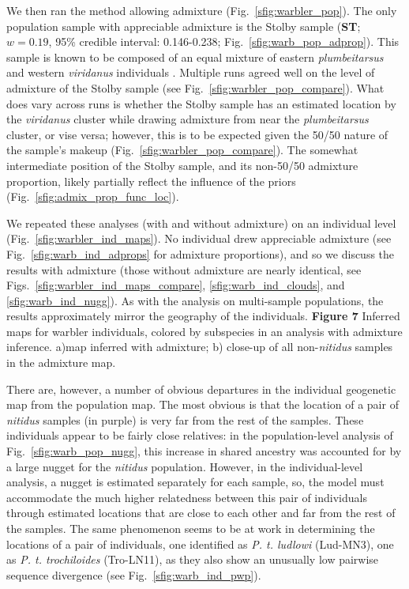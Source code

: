 \documentclass[10pt,letterpaper]{article}
\begin{document}
We then ran the method allowing admixture (Fig.\ \ref{sfig:warbler_pop}). The only population sample with appreciable admixture is the Stolby sample (\textbf{ST}; $w=0.19$, 95\% credible interval: 0.146-0.238; Fig.\ \ref{sfig:warb_pop_adprop}).  This sample is known to be composed of an equal mixture of eastern \textit{plumbeitarsus} and western \textit{viridanus} individuals \cite{alcaide2014genomic}. Multiple runs agreed well on the level of admixture of the Stolby sample (see Fig.\ \ref{sfig:warbler_pop_compare}). What does vary across runs is whether the Stolby sample has an estimated location by the \textit{viridanus} cluster while drawing admixture from near the \textit{plumbeitarsus} cluster, or vise versa; however, this is to be expected given the 50/50 nature of the sample's makeup (Fig.\ \ref{sfig:warbler_pop_compare}). The somewhat intermediate position of the Stolby sample, and its non-50/50 admixture proportion, likely partially reflect the influence of the priors (Fig.\ \ref{sfig:admix_prop_func_loc}). 

We repeated these analyses (with and without admixture) on an individual level (Fig.\ \ref{sfig:warbler_ind_maps}).  
No individual drew appreciable admixture (see Fig.\ \ref{sfig:warb_ind_adprops} for admixture proportions), and so we discuss the results with admixture (those without admixture are nearly identical, see Figs.\ \ref{sfig:warbler_ind_maps_compare}, \ref{sfig:warb_ind_clouds}, and \ref{sfig:warb_ind_nugg}).  As with the analysis on multi-sample populations, the results approximately mirror the geography of the individuals.
%
\newline\newline
{\bf{Figure 7}} Inferred maps for warbler individuals, colored by subspecies in an analysis with admixture inference.  a)map inferred with admixture; b) close-up of all non-\textit{nitidus} samples in the admixture map.
\newline\newline

There are, however, a number of obvious departures in the individual geogenetic map from the population map.  The most obvious is that the location of a pair of \textit{nitidus} samples (in purple) is very far from the rest of the samples.  
These individuals appear to be fairly close relatives:
in the population-level analysis of Fig.\ \ref{sfig:warb_pop_nugg},
this increase in shared ancestry was accounted for by a large nugget for the \textit{nitidus} population.
However, in the individual-level analysis, a nugget is estimated separately for each sample, 
so, the model must accommodate the much higher relatedness between this pair of individuals
through estimated locations that are close to each other and far from the rest of the samples.
The same phenomenon seems to be at work in determining the locations of a pair of individuals, one identified as \textit{P. t. ludlowi} (Lud-MN3), one as \textit{P. t. trochiloides} (Tro-LN11), 
as they also show an unusually low pairwise sequence divergence (see Fig.\ \ref{sfig:warb_ind_pwp}).
\end{document}
